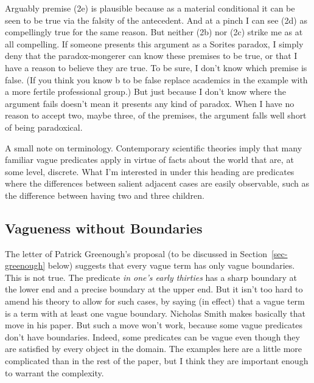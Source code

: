 \documentclass[
  10pt,
  letterpaper,
  DIV=11,
  numbers=noendperiod,
  twoside]{scrartcl}
\begin{document}
Arguably premise (2e) is plausible because as a material conditional it
can be seen to be true via the falsity of the antecedent. And at a pinch
I can see (2d) as compellingly true for the same reason. But neither
(2b) nor (2c) strike me as at all compelling. If someone presents this
argument as a Sorites paradox, I simply deny that the paradox-mongerer
can know these premises to be true, or that I have a reason to believe
they are true. To be sure, I don't know which premise is false. (If you
think you know b to be false replace academics in the example with a
more fertile professional group.) But just because I don't know where
the argument fails doesn't mean it presents any kind of paradox. When I
have no reason to accept two, maybe three, of the premises, the argument
falls well short of being paradoxical.

A small note on terminology. Contemporary scientific theories imply that
many familiar vague predicates apply in virtue of facts about the world
that are, at some level, discrete. What I'm interested in under this
heading are predicates where the differences between salient adjacent
cases are easily observable, such as the difference between having two
and three children.

\subsection{Vagueness without
Boundaries}\label{vagueness-without-boundaries}

The letter of Patrick Greenough's proposal (to be discussed in
Section~\ref{sec-greenough} below) suggests that every vague term has
only vague boundaries. This is not true. The predicate \emph{in one's
early thirties} has a sharp boundary at the lower end and a precise
boundary at the upper end. But it isn't too hard to amend his theory to
allow for such cases, by saying (in effect) that a vague term is a term
with at least one vague boundary. Nicholas Smith makes basically that
move in his paper. But such a move won't work, because some vague
predicates don't have boundaries. Indeed, some predicates can be vague
even though they are satisfied by every object in the domain. The
examples here are a little more complicated than in the rest of the
paper, but I think they are important enough to warrant the complexity.
\end{document}
